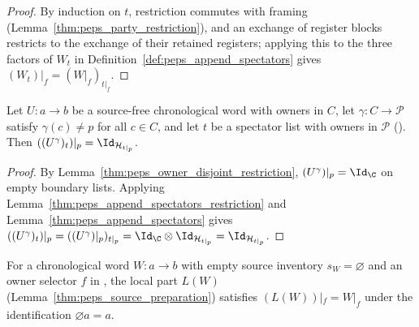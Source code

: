 \begin{proof}\leanok
    By induction on $t$, restriction commutes with framing
    (Lemma~\ref{thm:peps_party_restriction}), and an exchange of register
    blocks restricts to the exchange of their retained registers; applying
    this to the three factors of $W_t$ in
    Definition~\ref{def:peps_append_spectators} gives
    $(W_t)|_f=(W|_f)_{t|_f}$.
\end{proof}

\begin{lemma}
    \label{thm:peps_spectator_owner_exclusion}
    \leanok
    Let $U:a\to b$ be a source-free chronological word with owners in $C$, let
    $\gamma:C\to\mathcal P$ satisfy $\gamma(c)\ne p$ for all $c\in C$, and let
    $t$ be a spectator list with owners in $\mathcal P$
    (\cite[proof of Theorem~5.2]{OpenAI2026PolynomialPEPS}). Then
    $((U^\gamma)_t)|_p=\Id_{\mathcal H_{t|_p}}$.
\end{lemma}

\begin{proof}\leanok
    By Lemma~\ref{thm:peps_owner_disjoint_restriction}, $(U^\gamma)|_p=\Id_{\C}$
    on empty boundary lists. Applying Lemma~\ref{thm:peps_append_spectators_restriction}
    and Lemma~\ref{thm:peps_append_spectators} gives
    $((U^\gamma)_t)|_p=((U^\gamma)|_p)_{t|_p}=\Id_{\C}\otimes\Id_{\mathcal H_{t|_p}}=\Id_{\mathcal H_{t|_p}}$.
\end{proof}

\begin{lemma}
    \label{thm:peps_source_free_local_part_restriction}
    \leanok
    For a chronological word $W:a\to b$ with empty source inventory
    $s_W=\varnothing$ and an owner selector $f$ in
    \cite[proof of Theorem~5.2]{OpenAI2026PolynomialPEPS}, the local part
    $L(W)$ (Lemma~\ref{thm:peps_source_preparation}) satisfies
    $(L(W))|_f=W|_f$ under the identification $\varnothing a=a$.
\end{lemma}

